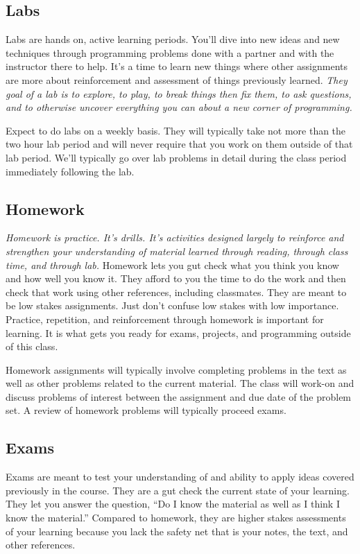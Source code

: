 \documentclass[10pt]{article}
\begin{document}
\subsection*{Labs}

Labs are hands on, active learning periods. You'll dive into new ideas and new techniques through programming problems done with a partner and with the instructor there to help. It's a time to learn new things where other assignments are more about reinforcement and assessment of things previously learned. \textit{They goal of a lab is to explore, to play, to break things then fix them, to ask questions, and to otherwise uncover everything you can about a new corner of programming.}

Expect to do labs on a weekly basis. They will typically take not more than the two hour lab period and will never require that you work on them outside of that lab period. We'll typically go over lab problems in detail during the class period immediately following the lab.

\subsection*{Homework}

\textit{Homework is practice. It's drills. It's activities designed largely to reinforce and strengthen your understanding of material learned through reading, through class time, and through lab.} Homework lets you gut check what you think you know and how well you know it. They afford to you the time to do the work and then check that work using other references, including classmates. They are meant to be low stakes assignments.  Just don't confuse low stakes with low importance. Practice, repetition, and reinforcement through homework is important for learning. It is what gets you ready for exams, projects, and programming outside of this class.

Homework assignments will typically involve completing problems in the text as well as other problems related to the current material. The class will work-on and discuss problems of interest between the assignment and due date of the problem set. A review of homework problems will typically proceed exams.

\subsection*{Exams}

Exams are meant to test your understanding of and ability to apply ideas covered previously in the course. They are a gut check the current state of your learning. They let you answer the question, ``Do I know the material as well as I think I know the material.''  Compared to homework, they are higher stakes assessments of your learning because you lack the safety net that is your notes, the text, and other references.
\end{document}
